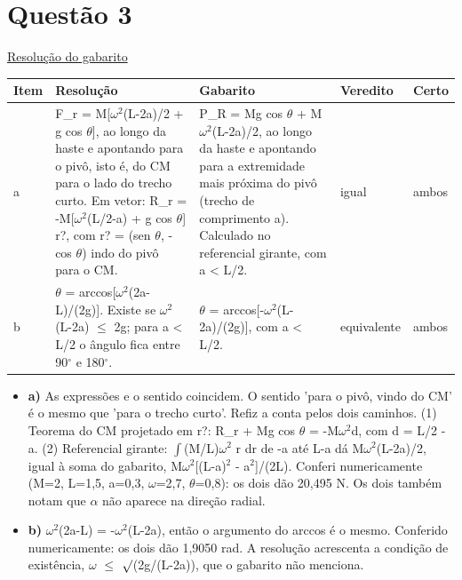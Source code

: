 \documentclass{article}%
\begin{document}
\section*{Questão 3}%
\href{https://poliedroresolve.sistemapoliedro.com.br/vestibulares/ita/2026/ita-2-fase-dia-3-30-10-2025-2-fase-dia-3/dissertativa-3-fisica-2-fase-dia-3-ita-2026}{Resolução do gabarito}\par\smallskip%
\begin{longtable}{@{}p{} p{} p{} p{} p{}@{}}\toprule Item & Resolução & Gabarito & Veredito & Certo \\ \midrule
a & F\_r = M{[}$\omega$$^2$(L-2a)/2 + g cos $\theta${]}, ao longo da haste e apontando para o pivô, isto é, do CM para o lado do trecho curto. Em vetor: R\_r = -M{[}$\omega$$^2$(L/2-a) + g cos $\theta${]} r?, com r? = (sen $\theta$, -cos $\theta$) indo do pivô para o CM. & P\_R = Mg cos $\theta$ + M$\omega$$^2$(L-2a)/2, ao longo da haste e apontando para a extremidade mais próxima do pivô (trecho de comprimento a). Calculado no referencial girante, com a < L/2. & igual & ambos \\
b & $\theta$ = arccos{[}$\omega$$^2$(2a-L)/(2g){]}. Existe se $\omega$$^2$(L-2a) $\leq$ 2g; para a < L/2 o ângulo fica entre 90$^\circ$ e 180$^\circ$. & $\theta$ = arccos{[}-$\omega$$^2$(L-2a)/(2g){]}, com a < L/2. & equivalente & ambos \\
\bottomrule\end{longtable}%
\begin{itemize}%
\item%
\textbf{a)} As expressões e o sentido coincidem. O sentido 'para o pivô, vindo do CM' é o mesmo que 'para o trecho curto'. Refiz a conta pelos dois caminhos. (1) Teorema do CM projetado em r?: R\_r + Mg cos $\theta$ = -M$\omega$$^2$d, com d = L/2 - a. (2) Referencial girante: $\int$(M/L)$\omega$$^2$ r dr de -a até L-a dá M$\omega$$^2$(L-2a)/2, igual à soma do gabarito, M$\omega$$^2${[}(L-a)$^2$ - a$^2${]}/(2L). Conferi numericamente (M=2, L=1,5, a=0,3, $\omega$=2,7, $\theta$=0,8): os dois dão 20,495 N. Os dois também notam que $\alpha$ não aparece na direção radial.%
\item%
\textbf{b)} $\omega$$^2$(2a-L) = -$\omega$$^2$(L-2a), então o argumento do arccos é o mesmo. Conferido numericamente: os dois dão 1,9050 rad. A resolução acrescenta a condição de existência, $\omega$ $\leq$ $\surd$(2g/(L-2a)), que o gabarito não menciona.%
\end{itemize}%
\end{document}
